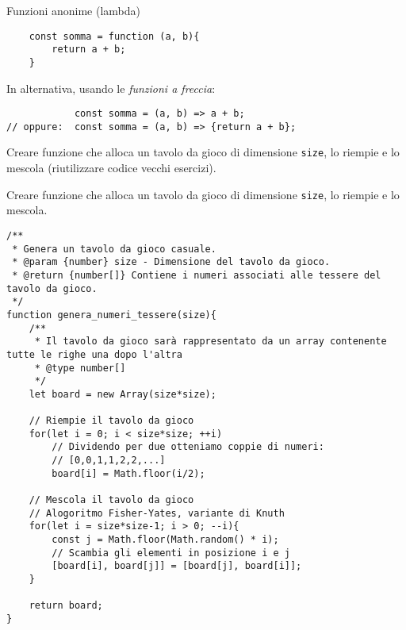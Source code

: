 \begin{frame}[fragile]{Funzioni anonime (lambda)}\transfade\centering
  \begin{verbatim}
    const somma = function (a, b){
        return a + b;
    }
  \end{verbatim}
  \pause\bigskip
  In alternativa, usando le \emph{funzioni a freccia}:
  \begin{verbatim}
            const somma = (a, b) => a + b;
// oppure:  const somma = (a, b) => {return a + b};
\end{verbatim}
\end{frame}

\begin{frame}\transfade
  \begin{exercise}\centering
    Creare funzione  che alloca un tavolo da gioco di dimensione \texttt{size}, lo riempie e lo mescola (riutilizzare codice vecchi esercizi).
  \end{exercise}
\end{frame}

\begin{frame}[fragile]\transfade
  \begin{sol}\centering
    Creare funzione  che alloca un tavolo da gioco di dimensione \texttt{size}, lo riempie e lo mescola.
      \begin{verbatim}
/**
 * Genera un tavolo da gioco casuale.
 * @param {number} size - Dimensione del tavolo da gioco.
 * @return {number[]} Contiene i numeri associati alle tessere del tavolo da gioco.
 */
function genera_numeri_tessere(size){
    /**
     * Il tavolo da gioco sarà rappresentato da un array contenente tutte le righe una dopo l'altra
     * @type number[]
     */
    let board = new Array(size*size);

    // Riempie il tavolo da gioco
    for(let i = 0; i < size*size; ++i)
        // Dividendo per due otteniamo coppie di numeri:
        // [0,0,1,1,2,2,...]
        board[i] = Math.floor(i/2);

    // Mescola il tavolo da gioco
    // Alogoritmo Fisher-Yates, variante di Knuth
    for(let i = size*size-1; i > 0; --i){
        const j = Math.floor(Math.random() * i);
        // Scambia gli elementi in posizione i e j
        [board[i], board[j]] = [board[j], board[i]];
    }

    return board;
}
      \end{verbatim}
  \end{sol}
\end{frame}